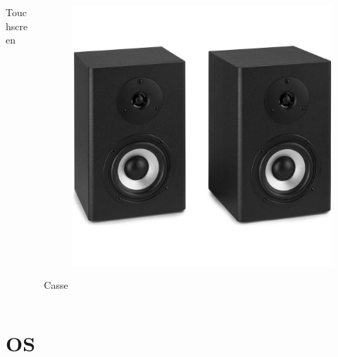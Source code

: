 \documentclass[]{beamer}
\begin{document}
\begin{frame}
\begin{columns}
\begin{column}{.22\textwidth}
\begin{center}
\begin{figure}
    \end{figure}
    Touchscreen
    \end{center}
\end{column}
\begin{column}{.22\textwidth}
  \begin{center} 
    \begin{figure}
      \includegraphics[width=\columnwidth]{img/casse.jpg}
    \end{figure}
    Casse
    \end{center}
\end{column}
\end{columns}
\end{frame}

\section{OS}
\end{document}
